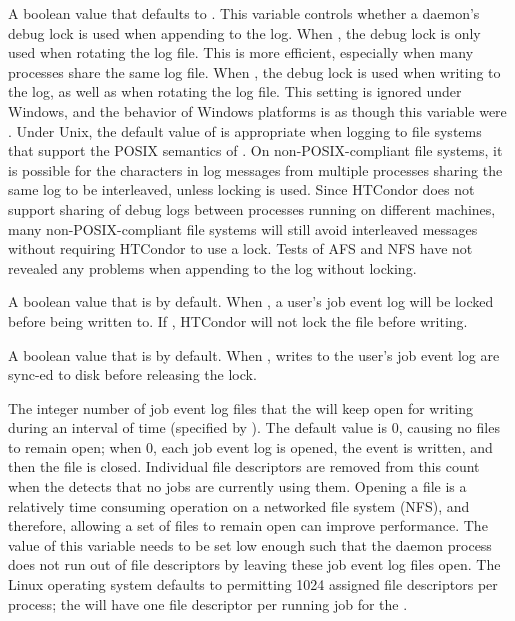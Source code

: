 \begin{description}
\label{param:LockDebugLogToAppend}
\item[\Macro{LOCK\_DEBUG\_LOG\_TO\_APPEND}]
  A boolean value that defaults to .
  This variable controls whether a daemon's debug lock is used when
  appending to the log.  
  When , the debug lock is only used when rotating the log file.
  This is more efficient, 
  especially when many processes share the same log file.
  When , the debug lock is used when writing to the log,
  as well as when rotating the log file.  
  This setting is ignored under Windows,
  and the behavior of Windows platforms is as though 
  this variable were .
  Under Unix, the default value of  is appropriate when
  logging to file systems that support the POSIX semantics of .
  On non-POSIX-compliant file systems, 
  it is possible for the characters in log messages from multiple processes
  sharing the same log to be interleaved, unless locking is used.
  Since HTCondor does not support sharing of debug logs between
  processes running on different machines, many non-POSIX-compliant
  file systems will still avoid interleaved messages without requiring
  HTCondor to use a lock.  Tests of AFS and NFS have
  not revealed any problems when appending to the log without locking.

\label{param:EnableUserlogLocking}
\item[\Macro{ENABLE\_USERLOG\_LOCKING}]
  A boolean value that is  by default.
  When , a user's job event log
  will be locked before being written to.
  If , HTCondor will not lock the file before writing.

\label{param:EnableUserlogFsync}
\item[\Macro{ENABLE\_USERLOG\_FSYNC}]
  A boolean value that is  by default.
  When , writes to the user's job event log are sync-ed to
  disk before releasing the lock.

\label{param:UserlogFileCacheMax}
\item[\Macro{USERLOG\_FILE\_CACHE\_MAX}]
  The integer number of job event log files that the 
  will keep open for writing during an interval of time
  (specified by ).
  The default value is 0, causing no files to remain open;
  when 0, each job event log is opened, the event is written, and then the
  file is closed.
  Individual file descriptors are removed from this count 
  when the  detects that no jobs are currently using them.
  Opening a file is a relatively time consuming operation on a
  networked file system (NFS),
  and therefore, 
  allowing a set of files to remain open can improve performance.
  The value of this variable needs to be set low enough such that the
   daemon process does not run out of file descriptors by
  leaving these job event log files open.
  The Linux operating system defaults to permitting 1024 assigned
  file descriptors per process; the  will have one
  file descriptor per running job for the . 


\end{description}
